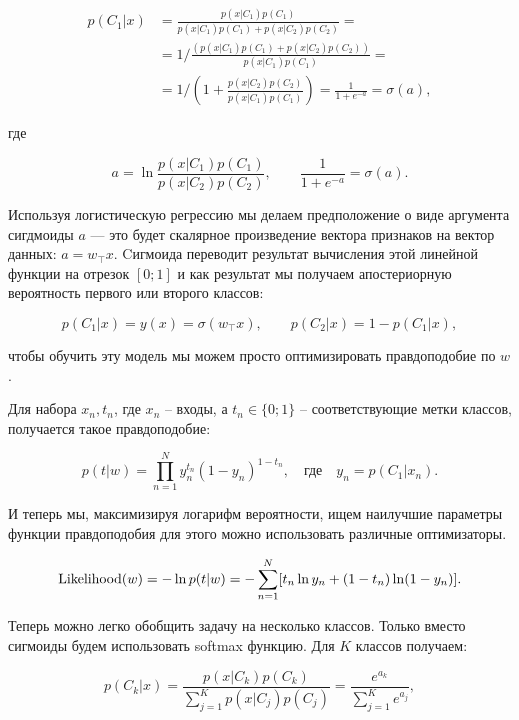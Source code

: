 \begin{equation}
\begin{aligned}
 p(C_1|x) & = \frac{p(x|C_1)p(C_1)}{p(x|C_1)p(C_1)+p(x|C_2)p(C_2)} = \\
 & = 1/\frac{(p(x|C_1)p(C_1)+p(x|C_2)p(C_2))}{p(x|C_1)p(C_1)} = \\
 & = 1/(1+\frac{p(x|C_2)p(C_2)}{p(x|C_1)p(C_1)}) = \frac{1}{1+e^{-a}} = \sigma (a),
\end{aligned}
\end{equation}

где

\begin{equation}
 a = \ln\frac{p(x|C_1)p(C_1)}{p(x|C_2)p(C_2)},\qquad \frac{1}{1+e^{-a}} = \sigma (a).
\end{equation}

Используя логистическую регрессию мы делаем предположение о виде аргумента сигдмоиды $a$ --- это будет
скалярное произведение вектора признаков на вектор данных: $a = w_\top x$. Cигмоида переводит результат
вычисления этой линейной функции на отрезок $[0;1]$ и как результат мы получаем апостериорную вероятность
первого или второго классов:

\begin{equation}
 p(C_1|x) = y(x) = \sigma (w_\top x),\qquad p(C_2|x) = 1-p(C_1|x),
\end{equation}

чтобы обучить эту модель мы можем просто оптимизировать правдоподобие по $w$.

Для набора ${x_n, t_n}$, где $x_n$ -- входы, а $t_n \in \{0;1\}$ -- соответствующие метки классов, получается
такое правдоподобие:

\begin{equation}
 p(t|w) = \prod_{n=1}^N y_n^{t_n}(1-y_n)^{1-t_n},\quad\text{где}\quad y_n = p(C_1|x_n).
\end{equation}

И теперь мы, максимизируя логарифм вероятности, ищем наилучшие параметры функции правдоподобия для этого можно
использовать различные оптимизаторы.

\begin{equation}
 \operatorname*{Likelihood} (w) = -\ln p(t|w) = -\sum_{n=1}^N[t_n \ln y_n + (1-t_n) \ln (1-y_n)].
\end{equation}

Теперь можно легко обобщить задачу на несколько классов. Только вместо сигмоиды будем использовать softmax
функцию. Для $K$ классов получаем:

\begin{equation}
 p(C_k|x) = \frac{p(x|C_k)p(C_k)}{\sum_{j=1}^K p(x|C_j)p(C_j)} = \frac{e^{a_k}}{\sum_{j=1}^K e^{a_j}},
\end{equation}

